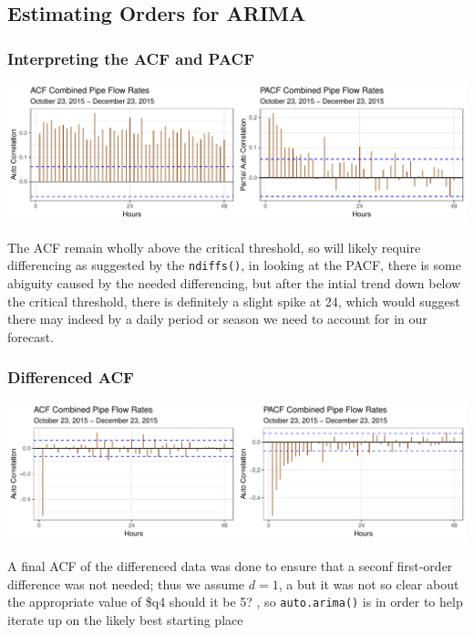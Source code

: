 \documentclass[openany]{book}
\begin{document}
\hypertarget{estimating-orders-for-arima}{%
\subsection{Estimating Orders for
ARIMA}\label{estimating-orders-for-arima}}

\hypertarget{interpreting-the-acf-and-pacf}{%
\subsubsection{Interpreting the ACF and
PACF}\label{interpreting-the-acf-and-pacf}}

\includegraphics{Group2_Project1_Fall2019_files/figure-latex/unnamed-chunk-20-1.pdf}

The ACF remain wholly above the critical threshold, so will likely
require differencing as suggested by the \texttt{ndiffs()}, in looking
at the PACF, there is some abiguity caused by the needed differencing,
but after the intial trend down below the critical threshold, there is
definitely a slight spike at 24, which would suggest there may indeed by
a daily period or season we need to account for in our forecast.

\hypertarget{differenced-acf}{%
\subsubsection{Differenced ACF}\label{differenced-acf}}

\includegraphics{Group2_Project1_Fall2019_files/figure-latex/unnamed-chunk-21-1.pdf}

A final ACF of the differenced data was done to ensure that a seconf
first-order difference was not needed; thus we assume \(d = 1\), a but
it was not so clear about the appropriate value of \$q4 should it be 5?
, so \texttt{auto.arima()} is in order to help iterate up on the likely
best starting place
\end{document}
